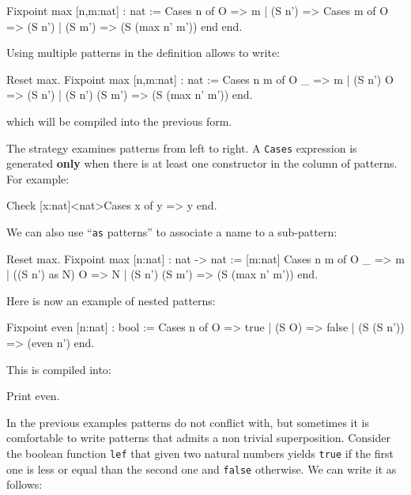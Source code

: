 \begin{coq_example}
Fixpoint max [n,m:nat] : nat :=
   Cases n of
      O     => m
   | (S n') => Cases m of
                  O     => (S n')
               | (S m') => (S (max n' m'))
               end
   end.
\end{coq_example}

Using multiple patterns in the definition allows to write:

\begin{coq_example}
Reset max.
Fixpoint max [n,m:nat] : nat :=
   Cases n m of
      O         _  => m   
   | (S n') O      => (S n')
   | (S n') (S m') => (S (max n' m')) 
   end.
\end{coq_example}

which will be compiled into the previous form.

The strategy examines patterns from left to right. A \texttt{Cases} expression
is generated {\bf only} when there is at least one constructor in the
column of patterns. For example:

\begin{coq_example}
Check [x:nat]<nat>Cases x of y => y end.
\end{coq_example}

We can also use ``\texttt{as} patterns'' to associate a name to a
sub-pattern:

\begin{coq_example}
Reset max.
Fixpoint max [n:nat] : nat -> nat :=
  [m:nat] Cases n m of
             O     _         => m   
          | ((S n') as N) O  => N
          | (S n') (S m')    => (S (max n' m')) 
         end.
\end{coq_example}

Here is now an example of nested patterns:

\begin{coq_example}
Fixpoint even [n:nat] : bool :=
   Cases n of
      O         => true
   | (S O)      => false
   | (S (S n')) => (even n')
   end.
\end{coq_example}

This is compiled into:

\begin{coq_example}
Print even.
\end{coq_example}

In the previous examples patterns do not conflict with, but
sometimes it is comfortable to write patterns that admits a non
trivial superposition. Consider
the boolean function \texttt{lef} that given two natural numbers
yields \texttt{true} if the first one is less or equal than the second
one and \texttt{false} otherwise. We can write it as follows:

